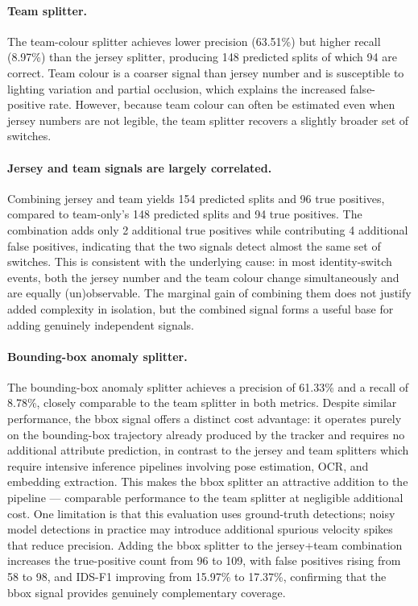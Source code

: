 \paragraph{Team splitter.}
The team-colour splitter achieves lower precision (63.51\%) but higher recall
(8.97\%) than the jersey splitter, producing 148 predicted splits of which 94
are correct. Team colour is a coarser signal than jersey number and is
susceptible to lighting variation and partial occlusion, which explains the
increased false-positive rate. However, because team colour can often be
estimated even when jersey numbers are not legible, the team splitter recovers
a slightly broader set of switches.

\paragraph{Jersey and team signals are largely correlated.}
Combining jersey and team yields 154 predicted splits and 96 true positives,
compared to team-only's 148 predicted splits and 94 true positives. The
combination adds only 2 additional true positives while contributing 4
additional false positives, indicating that the two signals detect almost
the same set of switches. This is consistent with the underlying cause: in
most identity-switch events, both the jersey number and the team colour change
simultaneously and are equally (un)observable. The marginal gain of combining
them does not justify added complexity in isolation, but the combined signal
forms a useful base for adding genuinely independent signals.

\paragraph{Bounding-box anomaly splitter.}
The bounding-box anomaly splitter achieves a precision of 61.33\% and a recall
of 8.78\%, closely comparable to the team splitter in both metrics. Despite
similar performance, the bbox signal offers a distinct cost advantage: it
operates purely on the bounding-box trajectory already produced by the tracker
and requires no additional attribute prediction, in contrast to the jersey and
team splitters which require intensive inference pipelines involving pose
estimation, OCR, and embedding extraction. This makes the bbox splitter an
attractive addition to the pipeline — comparable performance to the team
splitter at negligible additional cost. One limitation is that this evaluation
uses ground-truth detections; noisy model detections in practice may introduce
additional spurious velocity spikes that reduce precision. Adding the bbox
splitter to the jersey+team combination increases the true-positive count from
96 to 109, with false positives rising from 58 to 98, and IDS-F1 improving
from 15.97\% to 17.37\%, confirming that the bbox signal provides genuinely
complementary coverage.

